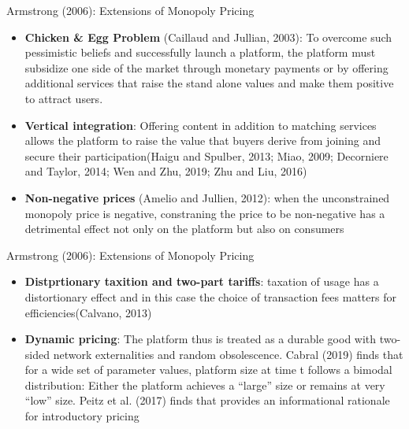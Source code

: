 \documentclass[aspectratio=169]{beamer}  %
\begin{document}
        

\begin{frame}{Armstrong (2006): Extensions of Monopoly Pricing}
    \justifying  %
    \begin{itemize}
        \item \textbf{Chicken \& Egg Problem} (Caillaud and Jullian, 2003): To overcome such pessimistic beliefs and successfully launch a platform, the platform must subsidize one side of the market through monetary payments or by offering additional services that raise the stand alone values and make them positive to attract users.
        \vspace{1em}
        \item \textbf{Vertical integration}: Offering content in addition to matching services allows the platform to raise the value that buyers derive from joining and secure their participation(Haigu and Spulber, 2013; Miao, 2009; Decorniere and Taylor, 2014; Wen and Zhu, 2019; Zhu and Liu, 2016)
        \vspace{1em}
        \item \textbf{Non-negative prices} (Amelio and Jullien, 2012): when the unconstrained monopoly price is negative, constraning the price to be non-negative has a detrimental effect not only on the platform but also on consumers        
    \end{itemize}
    
\end{frame}

\begin{frame}{Armstrong (2006): Extensions of Monopoly Pricing}
    \justifying  %
    \begin{itemize}
        \item \textbf{Distprtionary taxition and two-part tariffs}: taxation of usage has a distortionary effect and in this case the choice of transaction fees matters for efficiencies(Calvano, 2013)
        \vspace{1em}
        \item \textbf{Dynamic pricing}: The platform thus is treated as a durable good with two-sided network externalities and random obsolescence. Cabral (2019) finds that  for a wide set of parameter values, platform size at time t  follows a bimodal distribution: Either the platform achieves a “large” size or remains at very “low” size.
        Peitz et al. (2017) finds that provides an informational rationale for introductory pricing
        
    \end{itemize}
    
\end{frame}
\end{document}
